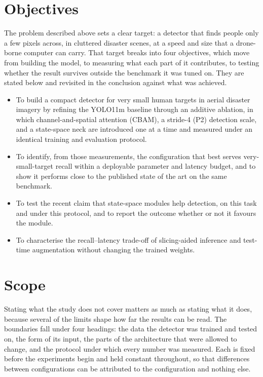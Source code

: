\documentclass[12pt,a4paper,oneside]{report}
\begin{document}
\section{Objectives}

The problem described above sets a clear target: a detector that finds people
only a few pixels across, in cluttered disaster scenes, at a speed and size that
a drone-borne computer can carry. That target breaks into four objectives, which
move from building the model, to measuring what each part of it contributes, to
testing whether the result survives outside the benchmark it was tuned on. They
are stated below and revisited in the conclusion against what was achieved.

\begin{itemize}
  \item To build a compact detector for very small human targets in aerial
        disaster imagery by refining the YOLO11m baseline through an additive
        ablation, in which channel-and-spatial attention (CBAM), a stride-4
        (P2) detection scale, and a state-space neck are introduced one at a
        time and measured under an identical training and evaluation protocol.
  \item To identify, from those measurements, the configuration that best
        serves very-small-target recall within a deployable parameter and
        latency budget, and to show it performs close to the published state
        of the art on the same benchmark.
  \item To test the recent claim that state-space modules help detection, on
        this task and under this protocol, and to report the outcome whether
        or not it favours the module.
  \item To characterise the recall--latency trade-off of slicing-aided
        inference and test-time augmentation without changing the trained
        weights.
\end{itemize}

\section{Scope}

Stating what the study does not cover matters as much as stating what it does,
because several of the limits shape how far the results can be read. The
boundaries fall under four headings: the data the detector was trained and tested
on, the form of its input, the parts of the architecture that were allowed to
change, and the protocol under which every number was measured. Each is fixed
before the experiments begin and held constant throughout, so that differences
between configurations can be attributed to the configuration and nothing else.
\end{document}
